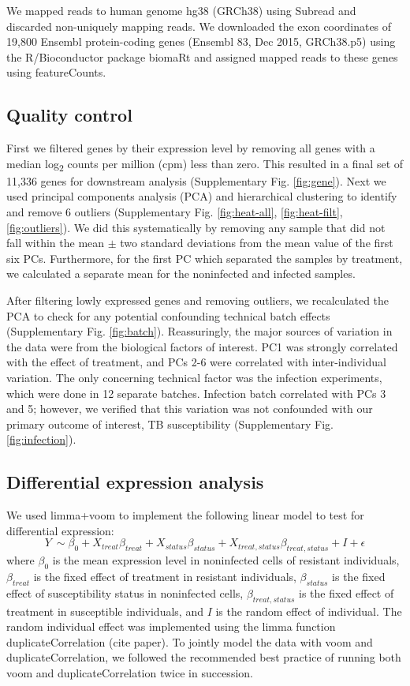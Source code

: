 \documentclass[fleqn,10pt]{wlscirep}
\begin{document}
We mapped reads to human genome hg38 (GRCh38) using Subread and discarded non-uniquely mapping reads. We downloaded the exon coordinates of 19,800 Ensembl protein-coding genes (Ensembl 83, Dec 2015, GRCh38.p5) using the R/Bioconductor package biomaRt and assigned mapped reads to these genes using featureCounts.
\subsection*{Quality control}

First we filtered genes by their expression level by removing all genes with a median log\textsubscript{2} counts per million (cpm) less than zero. This resulted in a final set of 11,336 genes for downstream analysis (Supplementary Fig. \ref{fig:gene}). Next we used principal components analysis (PCA) and hierarchical clustering to identify and remove 6 outliers (Supplementary Fig. \ref{fig:heat-all}, \ref{fig:heat-filt}, \ref{fig:outliers}). We did this systematically by removing any sample that did not fall within the mean $\pm$ two standard deviations from the mean value of the first six PCs. Furthermore, for the first PC which separated the samples by treatment, we calculated a separate mean for the noninfected and infected samples.

After filtering lowly expressed genes and removing outliers, we recalculated the PCA to check for any potential confounding technical batch effects (Supplementary Fig. \ref{fig:batch}). Reassuringly, the major sources of variation in the data were from the biological factors of interest. PC1 was strongly correlated with the effect of treatment, and PCs 2-6 were correlated with inter-individual variation. The only concerning technical factor was the infection experiments, which were done in 12 separate batches. Infection batch correlated with PCs 3 and 5; however, we verified that this variation was not confounded with our primary outcome of interest, TB susceptibility (Supplementary Fig. \ref{fig:infection}).
\subsection*{Differential expression analysis}

We used limma+voom \cite{Smyth2004, Law2014, Ritchie2015} to implement the following linear model to test for differential expression:
\begin{equation} \label{eq:limma}
Y\ \sim \beta_{0} + X_{treat}\beta_{treat} + X_{status}\beta_{status} + X_{treat,status}\beta_{treat,status} + I + \epsilon
\end{equation}
where $\beta_{0}$ is the mean expression level in noninfected cells of resistant individuals, $\beta_{treat}$ is the fixed effect of treatment in resistant individuals, $\beta_{status}$ is the fixed effect of susceptibility status in noninfected cells, $\beta_{treat,status}$ is the fixed effect of treatment in susceptible individuals, and $I$ is the random effect of individual. The random individual effect was implemented using the limma function duplicateCorrelation (cite paper). To jointly model the data with voom and duplicateCorrelation, we followed the recommended best practice of running both voom and duplicateCorrelation twice in succession.
\end{document}
